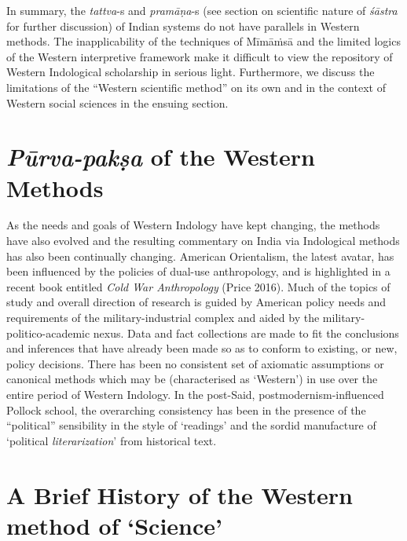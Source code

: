 In summary, the {\sl tattva}-s and {\sl pramāṇa}-s (see section on scientific nature of {\sl śāstra} for further discussion) of Indian systems do not have parallels in Western methods. The inapplicability of the techniques of Mīmāṁsā and the limited logics of the Western interpretive framework make it difficult to view the repository of Western Indological scholarship in serious light. Furthermore, we discuss the limitations of the ``Western scientific method'' on its own and in the context of Western social sciences in the ensuing section.

\section*{{{\sl\bfseries Pūrva-pakṣa}\relax} of the Western Methods}

As the needs and goals of Western Indology have kept changing, the methods have also evolved and the resulting commentary on India via Indological methods has also been continually changing. American Orientalism, the latest avatar, has been influenced by the policies of dual-use anthropology, and is highlighted in a recent book entitled {\sl Cold War Anthropology} (Price 2016). Much of the topics of study and overall direction of research is guided by American policy needs and requirements of the military-industrial complex and aided by the military-politico-academic nexus. Data and fact collections are made to fit the conclusions and inferences that have already been made so as to conform to existing, or new, policy decisions. There has been no consistent set of axiomatic assumptions or canonical methods which may be (characterised as `Western') in use over the entire period of Western Indology. In the post-Said, postmodernism-influenced Pollock school, the overarching consistency has been in the presence of the ``political'' sensibility in the style of `readings' and the sordid manufacture of `political {\sl literarization}' from historical text.

\section*{A Brief History of the Western method of `Science'}

